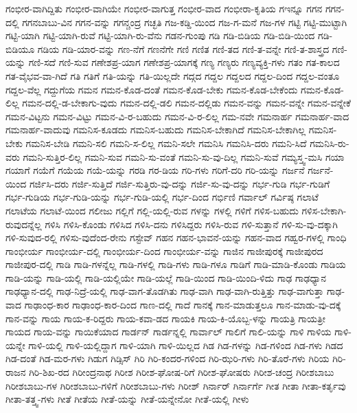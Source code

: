 {ಗಂಭೀರ-ವಾಗಿದ್ದಿತು
ಗಂಭೀರ-ವಾಗಿಯೇ
ಗಂಭೀರ-ವಾಗುತ್ತ
ಗಂಭೀರ-ವಾದ
ಗಂಭೀರಾ-ಕೃತಿಯ
ಗಇನ್ನೂ
ಗಗನ
ಗಗನ-ದಲ್ಲಿ
ಗಗನಬಾಬು-ವಿನ
ಗಗನ-ವನ್ನು
ಗಗನ್ಚಂದ್ರ
ಗಚ್ಛತಿ
ಗಜ-ಕಡ್ಡಿ-ಯಿಂದ
ಗಜ-ಗ-ಮನೆ
ಗಜ-ಗಳ
ಗಟ್ಟಿ
ಗಟ್ಟಿ-ಮುಟ್ಟಾಗಿ
ಗಟ್ಟಿ-ಯಾಗಿ
ಗಟ್ಟಿ-ಯಾಗಿ-ರುವೆ
ಗಟ್ಟಿ-ಯಾಗಿ-ರು-ವೆನು
ಗಡನ-ಗುಂಪು
ಗಡಿ
ಗಡಿ-ಬಿಡಿಯ
ಗಡಿ-ಬಿಡಿ-ಯಿಂದ
ಗಡಿ-ಬಿಡಿಯೂ
ಗಡಿಯ
ಗಡಿ-ಯಾರ-ವನ್ನು
ಗಣ-ನೆಗೆ
ಗಣನೆಗೇ
ಗಣಿ
ಗಣಿತ
ಗಣಿ-ತದ
ಗಣಿ-ತ-ವನ್ನೇ
ಗಣಿ-ತ-ಶಾಸ್ತ್ರದ
ಗಣಿ-ಯನ್ನು
ಗಣಿ-ಸದೆ
ಗಣಿ-ಸುವ
ಗಣೇಶಪ್ರ-ಯಾಗ
ಗಣೇಶಪ್ರ-ಯಾಗಕ್ಕೆ
ಗಣ್ಯ
ಗಣ್ಯರು
ಗಣ್ಯವ್ಯಕ್ತಿ-ಗಳು
ಗತಂ
ಗತ-ಕಾಲದ
ಗತ-ವೈಭವ-ವಾ-ಗಿದೆ
ಗತಿ
ಗತಿಗೆ
ಗತಿ-ಯನ್ನು
ಗತಿ-ಯಿಲ್ಲದೇ
ಗದ್ಗದ
ಗದ್ದಲ
ಗದ್ದಲದ
ಗದ್ದಲ-ದಿಂದ
ಗದ್ದಲ-ವಂತೂ
ಗದ್ದಲ-ವೆಲ್ಲ
ಗದ್ದುಗೆಯ
ಗಮನ
ಗಮನ-ಕೊಡ-ದಂತೆ
ಗಮನ-ಕೊಡ-ಬೇಕು
ಗಮನ-ಕೊಡ-ಬೇಕೆಂದು
ಗಮನ-ಕೊಡ-ಲಿಲ್ಲ
ಗಮನ-ದಲ್ಲಿ-ಡ-ಬೇಕಾಗು-ವುದು
ಗಮನ-ದಲ್ಲಿ-ಡಲಿ
ಗಮನ-ದಲ್ಲಿಡು
ಗಮನ-ವನ್ನು
ಗಮನ-ವನ್ನೇ
ಗಮನ-ವನ್ನೇಕೆ
ಗಮನ-ವಿಟ್ಟನು
ಗಮನ-ವಿಟ್ಟು
ಗಮನ-ವಿ-ರ-ಬಹುದು
ಗಮನ-ವಿ-ರ-ಲಿಲ್ಲ
ಗಮ-ನವೇ
ಗಮನಾರ್ಹ
ಗಮನಾರ್ಹ-ವಾದ
ಗಮನಾರ್ಹ-ವಾದುವು
ಗಮನಿಸ-ಕೂಡದು
ಗಮನಿಸ-ಬಹುದು
ಗಮನಿಸ-ಬೇಕಾಗಿದೆ
ಗಮನಿಸ-ಬೇಕಾಗಿಲ್ಲ
ಗಮನಿಸ-ಬೇಕು
ಗಮನಿಸ-ಬೇಡಿ
ಗಮನಿ-ಸಲಿ
ಗಮನಿ-ಸ-ಲಿಲ್ಲ
ಗಮನಿ-ಸಲೇ
ಗಮನಿಸಿ
ಗಮನಿಸಿ-ದರು
ಗಮನಿ-ಸಿದೆ
ಗಮನಿಸಿ-ರು-ವರು
ಗಮನಿ-ಸುತ್ತಿರ-ಲಿಲ್ಲ
ಗಮನಿ-ಸುವ
ಗಮನಿ-ಸು-ವಂತೆ
ಗಮನಿ-ಸು-ವು-ದಿಲ್ಲ
ಗಮನಿ-ಸುವೆ
ಗಮ್ಯಸ್ತ್ವ-ಮಸಿ
ಗಯಾ
ಗಯಾಗೆ
ಗಯೆಗೆ
ಗಯೆಯ
ಗಯೆ-ಯನ್ನು
ಗರಡಿ
ಗರ-ಡಿಯ
ಗರಿ-ಗಳು
ಗರಿಗೆ-ದರಿ
ಗರಿ-ಯನ್ನು
ಗರ್ಜನೆ
ಗರ್ಜನೆ-ಯಿಂದ
ಗರ್ಜಿಸಿ-ದರು
ಗರ್ಜಿ-ಸುತ್ತಿದೆ
ಗರ್ಜಿ-ಸುತ್ತಿರು-ವು-ದನ್ನು
ಗರ್ಜಿ-ಸು-ವು-ದನ್ನು
ಗರ್ಭ-ಗುಡಿ
ಗರ್ಭ-ಗುಡಿಗೆ
ಗರ್ಭ-ಗುಡಿಯ
ಗರ್ಭ-ಗುಡಿ-ಯನ್ನು
ಗರ್ಭ-ಗುಡಿ-ಯಲ್ಲಿ
ಗರ್ಭ-ದಿಂದ
ಗರ್ಭಿಣಿ
ಗರ್ವಾಲ್
ಗರ್ವಿಷ್ಠ
ಗಲಾಟೆ
ಗಲಾಟೆಯ
ಗಲಾಟೆ-ಯಿಂದ
ಗಲೀಜು
ಗಲ್ಲಿಗೆ
ಗಲ್ಲಿ-ಯಲ್ಲಿ-ರುವ
ಗಳನ್ನು
ಗಳಲ್ಲಿ
ಗಳಿಗೆ
ಗಳಿಸ-ಬಹುದು
ಗಳಿಸ-ಬೇಕಾಗಿ-ರುವುದನ್ನೆಲ್ಲ
ಗಳಿಸಿ
ಗಳಿಸಿ-ಕೊಂಡು
ಗಳಿಸಿದ
ಗಳಿಸಿ-ದನು
ಗಳಿಸಿದ್ದರು
ಗಳಿಸಿ-ರುವ
ಗಳಿ-ಸುತ್ತಾನೆ
ಗಳಿ-ಸು-ವು-ದಕ್ಕಾಗಿ
ಗಳಿ-ಸುವುದ-ರಲ್ಲಿ
ಗಳಿಸು-ವುದೆಂದ-ರೇನು
ಗಸ್ಟೇವ್
ಗಹನ
ಗಹನ-ಭಾವನೆ-ಯನ್ನು
ಗಹನ-ವಾದ
ಗಹ್ವರ-ಗಳಲ್ಲಿ
ಗಾಂಧಿ
ಗಾಂಭೀರ್ಯ
ಗಾಂಭೀರ್ಯ-ದಲ್ಲಿ
ಗಾಂಭೀರ್ಯ-ದಿಂದ
ಗಾಂಭೀರ್ಯ-ವನ್ನು
ಗಾಜಿನ
ಗಾಜೀಪುರಕ್ಕೆ
ಗಾಜೀಪುರದ
ಗಾಜೀಪುರ-ದಲ್ಲಿ
ಗಾಡಿ
ಗಾಡಿ-ಗಳನ್ನೆಲ್ಲ
ಗಾಡಿ-ಗಳಲ್ಲಿ
ಗಾಡಿ-ಗಳು
ಗಾಡಿ-ಗಳೂ
ಗಾಡಿಗೆ
ಗಾಡಿ-ಮಾಡಿ-ಕೊಂಡು
ಗಾಡಿಯ
ಗಾಡಿ-ಯನ್ನು
ಗಾಡಿ-ಯಲ್ಲಿ
ಗಾಡಿ-ಯಲ್ಲಿಯೇ
ಗಾಡಿ-ಯಲ್ಲೆ
ಗಾಡಿ-ಯಿಂದ
ಗಾಡಿ-ಯಿಂದಿ-ಳಿದು
ಗಾಢ
ಗಾಢಧ್ಯಾನ
ಗಾಢಧ್ಯಾನ-ದಲ್ಲಿ
ಗಾಢ-ನಿದ್ರೆ-ಯಲ್ಲಿ
ಗಾಢ-ವಾಗ-ತೊಡಗಿತು
ಗಾಢ-ವಾಗಿ
ಗಾಢ-ವಾಗಿ-ರುತ್ತಿತ್ತು
ಗಾಢ-ವಾಗುತ್ತಾ
ಗಾಢ-ವಾದ
ಗಾಢಾಂಧ-ಕಾರ
ಗಾಢಾಂಧ-ಕಾರ-ದಿಂದ
ಗಾಣ-ದಲ್ಲಿ
ಗಾದೆ
ಗಾನಕ್ಕೆ
ಗಾನ-ಮಾಡುತ್ತಲೂ
ಗಾನ-ಮಾಡು-ವು-ದಕ್ಕೆ
ಗಾನ-ವನ್ನು
ಗಾಯ
ಗಾಯ-ಕ-ರಿದ್ದರು
ಗಾಯ-ಕವಾ-ಡದ
ಗಾಯಕಿ
ಗಾಯ-ಕಿ-ಯೊಬ್ಬ-ಳನ್ನು
ಗಾಯತ್ರಿ
ಗಾಯತ್ರೀ
ಗಾಯದ
ಗಾಯ-ವನ್ನು
ಗಾಯಿಕೆಯಾದ
ಗಾರ್ಡನ್
ಗಾರ್ಡನ್ನಲ್ಲಿ
ಗಾರ್ವಾಲ್
ಗಾಲಿಗೆ
ಗಾಲಿ-ಯನ್ನು
ಗಾಳಿ
ಗಾಳಿಯ
ಗಾಳಿ-ಯನ್ನೇ
ಗಾಳಿ-ಯಲ್ಲಿ
ಗಾಳಿ-ಯಲ್ಲಿದ್ದಾಗ
ಗಾಳಿ-ಯಾಗಿ
ಗಾಳಿ-ಯಿಲ್ಲದ
ಗಿಡ
ಗಿಡ-ಗಳನ್ನು
ಗಿಡ-ಗಳಿಂದ
ಗಿಡ-ಗಳು
ಗಿಡದ
ಗಿಡ-ದಂತೆ
ಗಿಡ-ಮರ-ಗಳು
ಗಿಡುಗ
ಗಿಡ್ಸಿಸ್
ಗಿರಿ
ಗಿರಿ-ಕಂದರ-ಗಳಿಂದ
ಗಿರಿ-ಝರಿ-ಗಳು
ಗಿರಿ-ತೊರೆ-ಗಳು
ಗಿರಿಯ
ಗಿರಿ-ರಾಜನ
ಗಿರಿ-ಶಿಖ-ರದ
ಗಿರೀಂದ್ರನಾಥ
ಗಿರೀಶ
ಗಿರೀಶ-ಘೋಷ-ರಿಗೆ
ಗಿರೀಶ-ಘೋಷರು
ಗಿರೀಶ-ಚಂದ್ರ
ಗಿರೀಶಬಾಬು
ಗಿರೀಶಬಾಬು-ಗಳ
ಗಿರೀಶಬಾಬು-ಗಳಿಗೆ
ಗಿರೀಶಬಾಬು-ಗಳು
ಗಿರೀಶ್
ಗಿರ್ನಾರ್
ಗಿರ್ನಾರ್ಗೆ
ಗೀತ
ಗೀತಾ
ಗೀತಾ-ಕರ್ತೃವು
ಗೀತಾ-ತತ್ತ್ವ-ಗಳು
ಗೀತೆ
ಗೀತೆಯ
ಗೀತೆ-ಯನ್ನು
ಗೀತೆ-ಯನ್ನೇನೋ
ಗೀತೆ-ಯಲ್ಲಿ
ಗೀಳು
}
